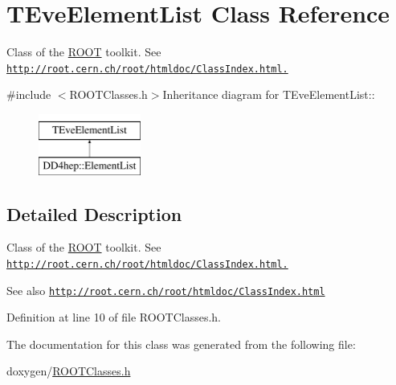 \hypertarget{class_t_eve_element_list}{
\section{TEveElementList Class Reference}
\label{class_t_eve_element_list}
}


Class of the \hyperlink{namespace_r_o_o_t}{ROOT} toolkit. See \href{http://root.cern.ch/root/htmldoc/ClassIndex.html.}{\tt http://root.cern.ch/root/htmldoc/ClassIndex.html.}  


{\ttfamily \#include $<$ROOTClasses.h$>$}Inheritance diagram for TEveElementList::\begin{figure}[H]
\begin{center}
\leavevmode
\includegraphics[height=2cm]{class_t_eve_element_list}
\end{center}
\end{figure}


\subsection{Detailed Description}
Class of the \hyperlink{namespace_r_o_o_t}{ROOT} toolkit. See \href{http://root.cern.ch/root/htmldoc/ClassIndex.html.}{\tt http://root.cern.ch/root/htmldoc/ClassIndex.html.} \begin{DoxySeeAlso}{See also}
\href{http://root.cern.ch/root/htmldoc/ClassIndex.html}{\tt http://root.cern.ch/root/htmldoc/ClassIndex.html} 
\end{DoxySeeAlso}


Definition at line 10 of file ROOTClasses.h.

The documentation for this class was generated from the following file:\begin{DoxyCompactItemize}
\item 
doxygen/\hyperlink{_r_o_o_t_classes_8h}{ROOTClasses.h}\end{DoxyCompactItemize}
